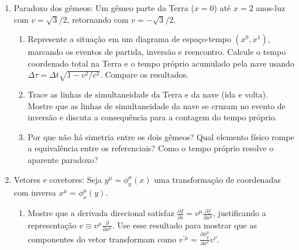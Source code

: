 \begin{enumerate}
\begin{enumerate}
                  \item Use o resultado anterior para mostrar que tanto o intervalo
                        $\Delta s^2 = \eta_{\mu\nu}\,\Delta x^\mu \Delta x^\nu$ quanto
                        o tempo próprio
                        $\Delta\tau = \int \sqrt{-\eta_{\mu\nu}\,\dot{x}^\mu\dot{x}^\nu}\,dt$
                        são invariantes sob transformações de Lorentz.
            \end{enumerate}

      \item Paradoxo dos gêmeos: Um gêmeo parte da Terra ($x = 0$) até $x = 2$
            anos-luz com $v = \sqrt{3}/2$, retornando com $v = -\sqrt{3}/2$.

            \begin{enumerate}
                  \item Represente a situação em um diagrama de espaço-tempo
                        $(x^0, x^1)$, marcando os eventos de partida, inversão e
                        reencontro. Calcule o tempo coordenado total na Terra e o tempo
                        próprio acumulado pela nave usando
                        $\Delta\tau = \Delta t\sqrt{1 - v^2/c^2}$. Compare os
                        resultados.

                  \item Trace as linhas de simultaneidade da Terra e da nave (ida e
                        volta). Mostre que as linhas de simultaneidade da nave se cruzam
                        no evento de inversão e discuta a consequência para a contagem
                        do tempo próprio.

                  \item Por que não há simetria entre os dois gêmeos? Qual elemento
                        físico rompe a equivalência entre os referenciais? Como o tempo
                        próprio resolve o aparente paradoxo?
            \end{enumerate}

      \item Vetores e covetores: Seja $y^\mu = \phi_y^\mu(x)$ uma transformação de
            coordenadas com inversa $x^\mu = \phi_x^\mu(y)$.

            \begin{enumerate}
                  \item Mostre que a derivada direcional satisfaz
                        $\frac{\partial f}{\partial v} = v^\mu\frac{\partial
                                    f}{\partial x^\mu}$, justificando a representação $v \equiv
                              v^\mu\frac{\partial}{\partial x^\mu}$. Use esse resultado para
                        mostrar que as componentes do vetor transformam como
                        $v^{\prime\mu} = \frac{\partial \phi_y^\mu}{\partial x^\nu}v^\nu$.


\end{enumerate}
\end{enumerate}
